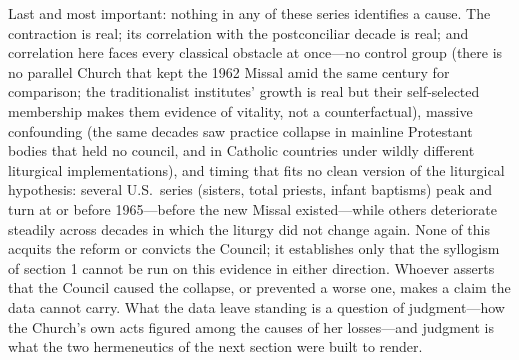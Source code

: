 Last and most important: nothing in any of these series identifies a cause. The contraction is real; its correlation with the postconciliar decade is real; and correlation here faces every classical obstacle at once---no control group (there is no parallel Church that kept the 1962 Missal amid the same century for comparison; the traditionalist institutes' growth is real but their self-selected membership makes them evidence of vitality, not a counterfactual), massive confounding (the same decades saw practice collapse in mainline Protestant bodies that held no council, and in Catholic countries under wildly different liturgical implementations), and timing that fits no clean version of the liturgical hypothesis: several U.S.\ series (sisters, total priests, infant baptisms) peak and turn at or before 1965---before the new Missal existed---while others deteriorate steadily across decades in which the liturgy did not change again. None of this acquits the reform or convicts the Council; it establishes only that the syllogism of section 1 cannot be run on this evidence in either direction. Whoever asserts that the Council caused the collapse, or prevented a worse one, makes a claim the data cannot carry. What the data leave standing is a question of judgment---how the Church's own acts figured among the causes of her losses---and judgment is what the two hermeneutics of the next section were built to render.

